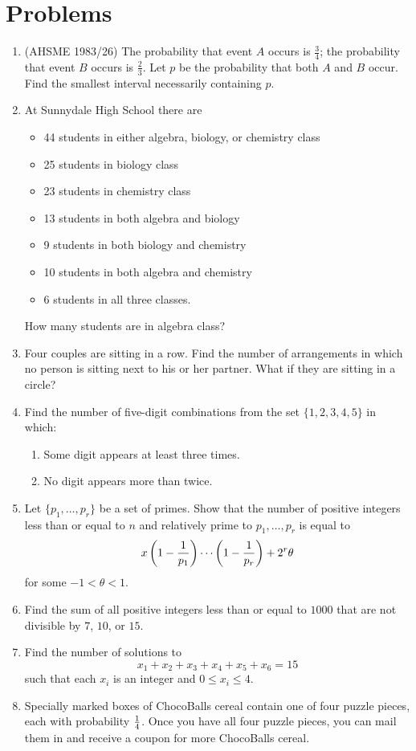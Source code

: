 \section{Problems}
\begin{enumerate}
\item (AHSME 1983/26) The probability that event $A$ occurs is $\frac 34$; the probability that event $B$ occurs is $\frac 23$. Let $p$ be the probability that both $A$ and $B$ occur. Find the smallest interval necessarily containing $p$.
\item At Sunnydale High School there are
\begin{itemize}
\item 44 students in either algebra, biology, or chemistry class
\item 25 students in biology class
\item 23 students in chemistry class
\item 13 students in both algebra and biology
\item 9 students in both biology and chemistry
\item 10 students in both algebra and chemistry
\item 6 students in all three classes.
\end{itemize}
How many students are in algebra class?
\item Four couples are sitting in a row. Find the number of arrangements in which no person is sitting next to his or her partner. What if they are sitting in a circle?
\item Find the number of five-digit combinations from the set $\{1,2,3,4,5\}$ in which:
\begin{enumerate}
\item
Some digit appears at least three times.
\item
No digit appears more than twice.
\end{enumerate}
\item Let $\{p_1,\ldots, p_r\}$ be a set of primes. Show that the number of positive integers less than or equal to $n$ and relatively prime to $p_1,\ldots, p_r$ is equal to
\[
x\left( {1-\frac{1}{p_1}} \right)\cdots \left( {1-\frac{1}{p_r}} \right)+2^r\theta
\]
for some $-1< \theta <1$.
\item Find the sum of all positive integers less than or equal to $1000$ that are not divisible by $7$, $10$, or $15$.
\item Find the number of solutions to
\[
x_1+x_2+x_3+x_4+x_5+x_6=15
\]
such that each $x_i$ is an integer and $0\le x_i\le 4$.
\item Specially marked boxes of ChocoBalls cereal contain one of four puzzle pieces, each with probability $\frac{1}{4}$. Once you have all four puzzle pieces, you can mail them in and receive a coupon for more ChocoBalls cereal.

\end{enumerate}
